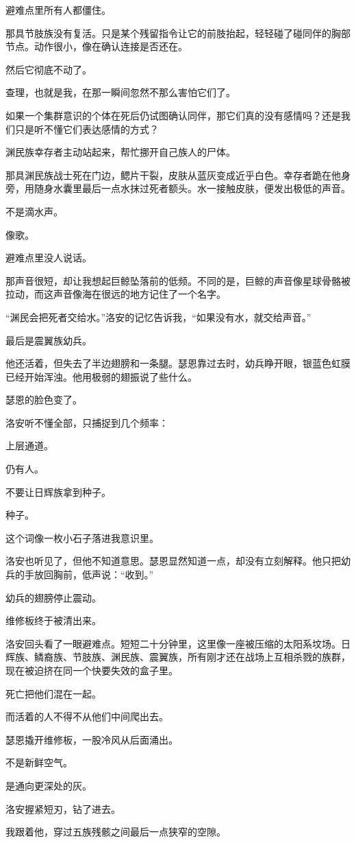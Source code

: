 避难点里所有人都僵住。

那具节肢族没有复活。只是某个残留指令让它的前肢抬起，轻轻碰了碰同伴的胸部节点。动作很小，像在确认连接是否还在。

然后它彻底不动了。

查理，也就是我，在那一瞬间忽然不那么害怕它们了。

如果一个集群意识的个体在死后仍试图确认同伴，那它们真的没有感情吗？还是我们只是听不懂它们表达感情的方式？

渊民族幸存者主动站起来，帮忙挪开自己族人的尸体。

那具渊民族战士死在门边，鳃片干裂，皮肤从蓝灰变成近乎白色。幸存者跪在他身旁，用随身水囊里最后一点水抹过死者额头。水一接触皮肤，便发出极低的声音。

不是滴水声。

像歌。

避难点里没人说话。

那声音很短，却让我想起巨鲸坠落前的低频。不同的是，巨鲸的声音像星球骨骼被拉动，而这声音像海在很远的地方记住了一个名字。

“渊民会把死者交给水。”洛安的记忆告诉我，“如果没有水，就交给声音。”

最后是震翼族幼兵。

他还活着，但失去了半边翅膀和一条腿。瑟恩靠过去时，幼兵睁开眼，银蓝色虹膜已经开始浑浊。他用极弱的翅振说了些什么。

瑟恩的脸色变了。

洛安听不懂全部，只捕捉到几个频率：

上层通道。

仍有人。

不要让日辉族拿到种子。

种子。

这个词像一枚小石子落进我意识里。

洛安也听见了，但他不知道意思。瑟恩显然知道一点，却没有立刻解释。他只把幼兵的手放回胸前，低声说：“收到。”

幼兵的翅膀停止震动。

维修板终于被清出来。

洛安回头看了一眼避难点。短短二十分钟里，这里像一座被压缩的太阳系坟场。日辉族、鳞裔族、节肢族、渊民族、震翼族，所有刚才还在战场上互相杀戮的族群，现在被迫挤在同一个快要失效的盒子里。

死亡把他们混在一起。

而活着的人不得不从他们中间爬出去。

瑟恩撬开维修板，一股冷风从后面涌出。

不是新鲜空气。

是通向更深处的灰。

洛安握紧短刃，钻了进去。

我跟着他，穿过五族残骸之间最后一点狭窄的空隙。
